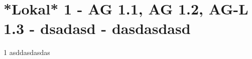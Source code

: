 \section{*Lokal* 1 - AG 1.1, AG 1.2, AG-L 1.3 - dsadasd - dasdasdasd}

\begin{langesbeispiel} \item[1] %
asddasdasdas

\end{langesbeispiel}